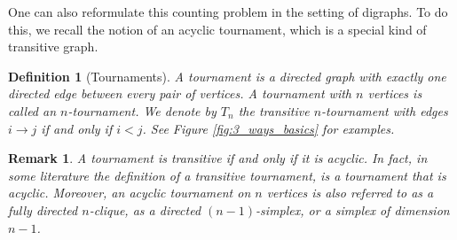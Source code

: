 \documentclass[9pt,a4paper,oneside]{article}
\newtheorem{remark}[theorem]{Remark}
\newtheorem{definition}[theorem]{Definition}
\begin{document}
One can also reformulate this counting problem in the setting of digraphs. To do this, we recall the notion of an acyclic tournament, which is a special kind of transitive graph.

\begin{definition}[Tournaments]
A \emph{tournament} is a directed graph with exactly one directed edge between every pair of vertices. A tournament with $n$ vertices is called an \emph{$n$-tournament}. 
We denote by $T_n$ the \emph{transitive} $n$-tournament with edges $i\to j$ if and only if $i<j$.  See Figure \ref{fig:3_ways_basics} for examples.
\end{definition}

\begin{remark}
A tournament is transitive if and only if it is acyclic.  In fact, in some literature the definition of a transitive tournament, is a tournament that is acyclic.
Moreover, an acyclic tournament on $n$ vertices is also referred to as a fully directed $n$-clique, as a directed $(n-1)$-simplex, or a simplex of dimension $n-1$.
\end{remark}
\end{document}
